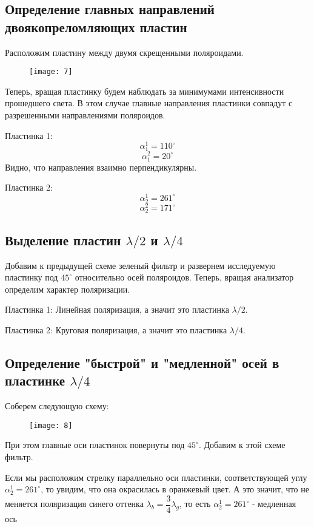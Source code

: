 	\subsection{Определение главных направлений двоякопреломляющих пластин}

	Расположим пластину между двумя скрещенными поляроидами.
	\begin{figure}[H]
		\centering
		\texttt{[image: 7]}
	\end{figure}
	Теперь, вращая пластинку будем наблюдать за минимумами интенсивности прошедшего света. В этом случае главные направления пластинки совпадут с разрешенными направлениями поляроидов.
	
	Пластинка 1:
	\[
		\alpha_1^1 = 110^\circ
	\]
	\[
		\alpha_1^2 = 20^\circ
	\]
	Видно, что направления взаимно перпендикулярны.
	
	Пластинка 2:
	\[
	\alpha_2^1 = 261^\circ
	\]
	\[
	\alpha_2^2 = 171^\circ
	\]
	
	\subsection{Выделение пластин $\lambda/2$ и $\lambda/4$}
	Добавим к предыдущей схеме зеленый фильтр и развернем исследуемую пластинку под $45^\circ$ относительно осей поляроидов. Теперь, вращая анализатор определим характер поляризации.
	
	Пластинка 1: Линейная поляризация, а значит это пластинка $\lambda/2$.
	
	Пластинка 2: Круговая поляризация, а значит это пластинка $\lambda/4$.
	
	\subsection{Определение "быстрой" и "медленной" осей в пластинке $\lambda/4$}
	
	Соберем следующую схему:
	\begin{figure}[H]
		\centering
		\texttt{[image: 8]}
	\end{figure}
	При этом главные оси пластинок повернуты под $45^\circ$. Добавим к этой схеме фильтр. 
	
	Если мы расположим стрелку параллельно оси пластинки, соответствующей углу $\alpha_2^1 = 261^\circ$, то увидим, что она окрасилась в оранжевый цвет. А это значит, что не меняется поляризация синего оттенка $\lambda_b = \dfrac{3}{4}\lambda_g$, то есть $\alpha_2^1 = 261^\circ$ - медленная ось
	
